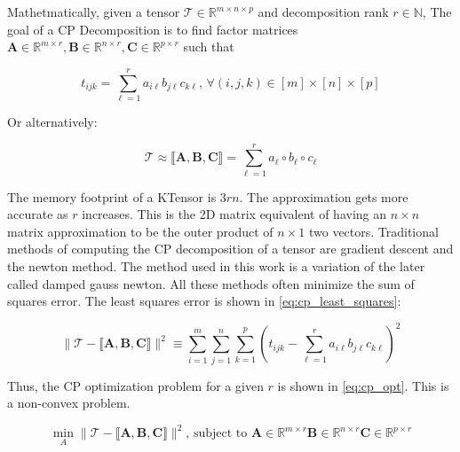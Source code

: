     Mathetmatically, given a tensor $\mathcal{T} \in \mathbb{R}^{m\times n\times
    p}$ and decomposition rank $r\in \mathbb{N}$, The goal of a CP Decomposition
    is to find factor matrices $\mathbf{A}\in \mathbb{R}^{m\times r},
    \mathbf{B}\in \mathbb{R}^{n\times r}, \mathbf{C}\in \mathbb{R}^{p\times r}$
    such that 

    \begin{equation}
        t_{ijk} = \sum_{\ell = 1}^{r} a_{i\ell}b_{j\ell}c_{k\ell} \text{, } \forall (i, j, k) \in [m]\times [n]\times [p]
    \end{equation}

    Or alternatively:

    \begin{equation}
        \mathcal{T} \approx \llbracket \mathbf{A, B, C} \rrbracket = \sum_{\ell = 1}^{r} a_\ell \circ b_\ell \circ c_\ell
    \end{equation}

    The memory footprint of a KTensor is $3rn$. The approximation gets more
    accurate as $r$ increases. This is the 2D matrix equivalent of having an
    $n\times n$ matrix approximation to be the outer product of $n \times 1$ two
    vectors. Traditional methods of computing the CP decomposition of a tensor
    are gradient descent and the newton method. The method used in this work is
    a variation of the later called damped gauss newton. All these methods often
    minimize the sum of squares error. The least squares error is shown in
    \ref{eq:cp_least_squares}:

    \begin{equation} \label{eq:cp_least_squares}
        \|\mathcal{T} - \llbracket \mathbf{A, B, C} \rrbracket \|^2 \equiv \sum_{i=1}^{m} \sum_{j=1}^{n} \sum_{k=1}^{p}\left(t_{ijk} - \sum_{\ell=1}^{r} a_{i\ell}b_{j\ell}c_{k\ell} \right)^2
    \end{equation}

    Thus, the CP optimization problem for a given $r$ is shown in
    \ref{eq:cp_opt}. This is a non-convex problem. 

    \begin{equation} \label{eq:cp_opt}
        \min_{A} \|\mathcal{T} - \llbracket \mathbf{A, B, C} \rrbracket \|^2 \text{, subject to } \mathbf{A} \in \mathbb{R}^{m\times r} \mathbf{B} \in \mathbb{R}^{n\times r} \mathbf{C} \in \mathbb{R}^{p\times r}
    \end{equation}
        




